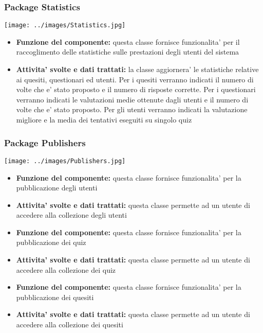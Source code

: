 			\subsubsection{Package Statistics}
			\begin{center}
				\texttt{[image: ../images/Statistics.jpg]}
			\end{center}
 			\begin{itemize}
		    	\item\textbf{Funzione del componente:} questa classe fornisce funzionalita' per il raccoglimento delle statistiche sulle prestazioni degli utenti del sistema
			\item\textbf{Attivita' svolte e dati trattati:} la classe aggiornera' le statistiche relative ai quesiti, questionari ed utenti.
			Per i quesiti verranno indicati il numero di volte che e' stato proposto e il numero di risposte corrette.
			Per i questionari verranno indicati le valutazioni medie ottenute dagli utenti e il numero di volte che e' stato proposto.
			Per gli utenti verranno indicati la valutazione migliore e la media dei tentativi eseguiti su singolo quiz
			\end{itemize}
			
			\subsubsection{Package Publishers}
			\begin{center}
				\texttt{[image: ../images/Publishers.jpg]}
			\end{center}
			\begin{itemize}
				\item\textbf{Funzione del componente:} questa classe fornisce funzionalita' per la pubblicazione degli utenti
				\item\textbf{Attivita' svolte e dati trattati:} questa classe permette ad un utente di accedere alla collezione degli utenti
			\end{itemize}
			\begin{itemize}
				\item\textbf{Funzione del componente:} questa classe fornisce funzionalita' per la pubblicazione dei quiz
				\item\textbf{Attivita' svolte e dati trattati:} questa classe permette ad un utente di accedere alla collezione dei quiz
			\end{itemize}
			\begin{itemize}
				\item\textbf{Funzione del componente:} questa classe fornisce funzionalita' per la pubblicazione dei quesiti
				\item\textbf{Attivita' svolte e dati trattati:} questa classe permette ad un utente di accedere alla collezione dei quesiti
			\end{itemize}